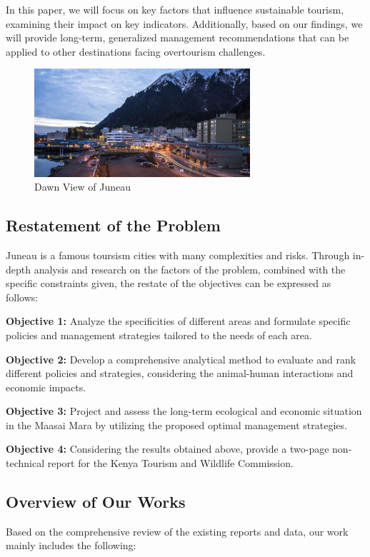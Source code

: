 \documentclass[UTF8]{mcmthesis}
\begin{document}
            In this paper, we will focus on key factors that influence sustainable tourism, examining their impact on key indicators. Additionally, based on our findings, we will provide long-term, generalized management recommendations that can be applied to other destinations facing overtourism challenges.

            \begin{figure}[htbp]
                \centering
                \includegraphics[width=8cm]{figure1.png}
                \caption{Dawn View of Juneau}
            \end{figure}
        
        \subsection{Restatement of the Problem}
        \hspace*{2em}Juneau is a famous toursism cities with many complexities and risks. Through in-depth analysis and research on the factors of the problem, combined with the specific constraints given, the restate of the objectives can be expressed as follows:


   
           \textbf{Objective 1:} Analyze the specificities of different areas and formulate specific policies and management strategies tailored to the needs of each area.
            
           \textbf{Objective 2:} Develop a comprehensive analytical method to evaluate and rank different policies and strategies, considering the animal-human interactions and economic impacts.
           
           \textbf{Objective 3:} Project and assess the long-term ecological and economic situation in the Maasai Mara by utilizing the proposed optimal management strategies.
           
           \textbf{Objective 4:} Considering the results obtained above, provide a two-page non-technical report for the Kenya Tourism and Wildlife Commission.

        \subsection{Overview of Our Works}
        \hspace*{2em} Based on the comprehensive review of the existing reports and data, our work mainly includes the following:
\end{document}
